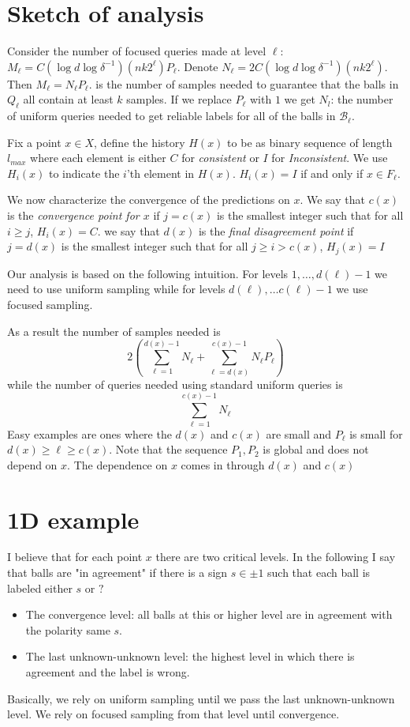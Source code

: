 \documentclass{article}
\def\B{{\mathcal B}}
\begin{document}
\section{Sketch of analysis}

Consider the number of focused queries made at level $\ell$: $M_\ell = C (\log d \log \delta^{-1})(n k 2^\ell) P_\ell$.
Denote $N_\ell = 2C (\log d \log \delta^{-1})(n k 2^\ell)$. Then $M_{\ell} = N_\ell P_\ell$. is the number of samples needed to guarantee that the balls in $Q_\ell$ all contain at least $k$ samples. 
If we replace $P_\ell$ with $1$ we get $N_l$: the number of uniform queries needed to get reliable labels for all 
of the balls in $\B_\ell$.

Fix a point $x\in X$, define the history $H(x)$ to be as binary sequence of length $l_{max}$ where each element is either 
$C$ for {\em consistent} or $I$ for {\em Inconsistent}.  We use $H_i(x)$ to indicate the $i$'th element in $H(x)$.
$H_i(x)=I$ if and only if $x \in F_\ell$.

We now characterize the convergence of the predictions on $x$.  We say that $c(x)$ is the {\em convergence point for $x$} if $j=c(x)$ is the smallest integer such that for all $i\geq j$, $H_i(x)=C$. we say that $d(x)$ is the {\em final disagreement point} if $j=d(x)$ is the smallest integer such that for all $j \geq i > c(x)$, $H_j(x)=I$

Our analysis is based on the following intuition. For levels $1,\ldots,d(\ell)-1$ we need to use uniform sampling while for levels $d(\ell),\ldots c(\ell)-1$ we use focused sampling.

As a result the number of samples needed is 
$$ 2\left( \sum_{\ell=1}^{d(x)-1} N_{\ell} + \sum_{\ell=d(x)}^{c(x)-1} N_\ell P_\ell \right) $$ while the number of queries needed  using standard uniform queries is  
$$ \sum_{\ell=1}^{c(x)-1} N_{\ell} $$
Easy examples are ones where the $d(x)$ and $c(x)$ are small and $P_\ell$ is small for $d(x)\geq \ell \geq c(x)$. Note that the sequence $P_1,P_2$ is global and does not depend on $x$. The dependence on $x$ comes in through $d(x)$ and $c(x)$
\pagebreak
\section{1D example}
I believe that for each point $x$ there are two critical levels. In the following I say that balls are "in agreement" if there is a sign $s \in \pm 1$ such that each ball is labeled either $s$ or $?$
\begin{itemize}
    \item The convergence level: all balls at this or higher level are in agreement with the polarity same $s$.
    \item The last unknown-unknown level: the highest level in which there is agreement and the label is wrong.
\end{itemize}
Basically, we rely on uniform sampling until we pass the last unknown-unknown level. We rely on focused sampling from that level until convergence.
\end{document}
